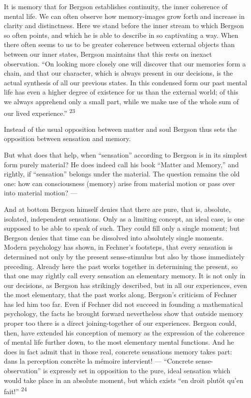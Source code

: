 \documentclass[12pt,a4paper,openany]{book}
\newcommand{\opage}[1]{\marginnote{\footnotesize\textit{[#1]}}}
\newcommand{\nm}[1]{\unskip\textsuperscript{#1}}
\begin{document}
It is memory that for Bergson establishes continuity, the inner coherence of mental life. We can often observe how memory-images grow forth and increase in clarity and distinctness. Here we stand before the inner stream to which Bergson so often points, and which he is able to describe in so captivating a way. When there often seems to us to be greater coherence between external objects than between our inner states, Bergson maintains that this rests on inexact observation. ``On looking more closely one will discover that our memories form a chain, and that our character, which is always present in our decisions, is the actual synthesis of all our previous states. In this condensed form our past mental life has even a higher degree of existence for us than the external world; of this we always apprehend only a small part, while we make use of the whole sum of our lived experience.'' \nm{23}

Instead of the usual opposition between matter and soul Bergson thus sets the opposition between sensation and memory.

But what does that help, when ``sensation'' according to Bergson is in its simplest form purely material? He does indeed call his book ``Matter and Memory,'' and rightly, if ``sensation'' belongs under the material. The question remains the old one: how can consciousness (memory) arise from material motion or pass over into material motion? ---

And at bottom Bergson himself denies that there are pure, that is, absolute, isolated, independent sensations. Only as a limiting concept, an ideal case, is one supposed to be able to speak of such. They could fill only a single moment; but Bergson denies that time can be dissolved into absolutely single moments. Modern psychology has shown, in Fechner's footsteps, that every sensation is determined not only by the present sense-stimulus but also by those immediately preceding. Already here the past works together in determining
\opage{31}the present, so that one may rightly call every sensation an elementary memory. It is not only in our decisions, as Bergson has strikingly described, but in all our experiences, even the most elementary, that the past works along. Bergson's criticism of Fechner has led him too far. Even if Fechner did not succeed in founding a mathematical psychology, the facts he brought forward nevertheless show that outside memory proper too there is a direct joining-together of our experiences. Bergson could, then, have extended his conception of memory as the expression of the coherence of mental life further down, to the most elementary mental functions. And he does in fact admit that in those real, concrete sensations memory takes part: dans la perception concrète la mémoire intervient! --- ``Concrete sense-observation'' is expressly set in opposition to the pure, ideal sensation which would take place in an absolute moment, but which exists ``en droit plutôt qu'en fait!'' \nm{24}
\end{document}
